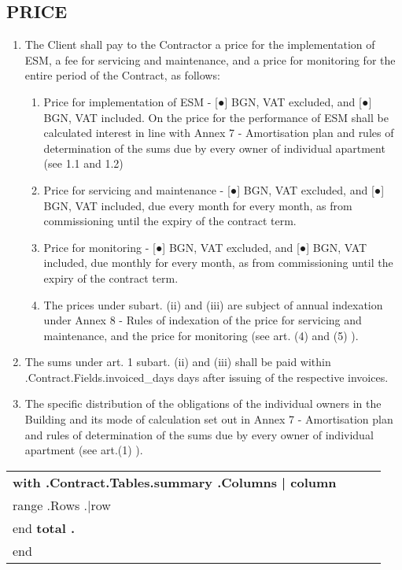 \subsection{PRICE}
\begin{enumerate}
\item The Client shall pay to the Contractor a price for the
  implementation of ESM, a fee for servicing and maintenance, and a
  price for monitoring for the entire period of the Contract, as
  follows:
  \begin{enumerate}
  \item Price for implementation of ESM {-} [●] BGN, VAT excluded, and
    [●] BGN, VAT included. On the price for the performance of ESM
    shall be calculated interest in line with Annex 7 {-} Amortisation
    plan and rules of determination of the sums due by every owner of
    individual apartment (see 1.1 and 1.2)
  \item Price for servicing and maintenance {-} [●] BGN, VAT excluded,
    and [●] BGN, VAT included, due every month for every month, as
    from commissioning until the expiry of the contract term.
  \item Price for monitoring {-} [●] BGN, VAT excluded, and [●] BGN,
    VAT included, due monthly for every month, as from commissioning
    until the expiry of the contract term.
  \item The prices under subart. (ii) and (iii) are subject of
    annual indexation under Annex 8 {-} Rules of indexation of the
    price for servicing and maintenance, and the price for monitoring
    (see art. (4) and (5) ).
  \end{enumerate}
\item The sums under art. 1 subart. (ii) and (iii) shall be
  paid within {{.Contract.Fields.invoiced_days}} days after issuing of the respective invoices.
\item The specific distribution of the obligations of the individual
  owners in the Building and its mode of calculation set out in Annex
  7 {-} Amortisation plan and rules of determination of the sums due
  by every owner of individual apartment (see art.(1) ).
\end{enumerate}

\begin{center}
  \begin{tabu}{|X|X|X|X|}\tabucline{}\rowfont[c]\bfseries
    {{with .Contract.Tables.summary}} %
    {{.Columns | column}} \\\tabucline{} {{range .Rows}} %
    {{.|row}} \\\tabucline{} {{end}} \bfseries {{total .}}
    \\\tabucline{} %
    {{end}}
  \end{tabu}
\end{center}

